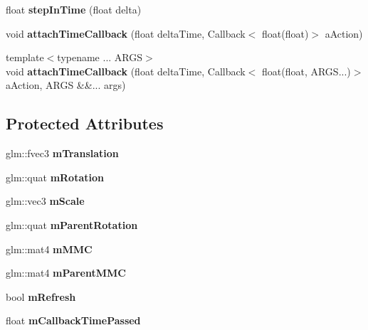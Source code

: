 \begin{DoxyCompactItemize}
float {\bfseries step\+In\+Time} (float delta)
\item 
\mbox{\label{classflw_1_1flf_1_1Moveable_a1f94fcdf158004066e124a9a189def51}} 
void {\bfseries attach\+Time\+Callback} (float delta\+Time, Callback$<$ float(float)$>$ a\+Action)
\item 
\mbox{\label{classflw_1_1flf_1_1Moveable_a3e0bad485cd760d414809477daeadefe}} 
{\footnotesize template$<$typename ... A\+R\+GS$>$ }\\void {\bfseries attach\+Time\+Callback} (float delta\+Time, Callback$<$ float(float, A\+R\+G\+S...)$>$ a\+Action, A\+R\+GS \&\&... args)
\end{DoxyCompactItemize}
\subsection*{Protected Attributes}
\begin{DoxyCompactItemize}
\item 
\mbox{\label{classflw_1_1flf_1_1Moveable_abd1fd2b2b524cdb423e67ba77ca16289}} 
glm\+::fvec3 {\bfseries m\+Translation}
\item 
\mbox{\label{classflw_1_1flf_1_1Moveable_aa1c54ef32d7a521204176b96fbc8a15a}} 
glm\+::quat {\bfseries m\+Rotation}
\item 
\mbox{\label{classflw_1_1flf_1_1Moveable_ae02a226aef8ed36d884ed411e6178bee}} 
glm\+::vec3 {\bfseries m\+Scale}
\item 
\mbox{\label{classflw_1_1flf_1_1Moveable_ae390565c91451ffcc468e7819bc6d9fe}} 
glm\+::quat {\bfseries m\+Parent\+Rotation}
\item 
\mbox{\label{classflw_1_1flf_1_1Moveable_ad3c392a33196d2e71163e96e2e9522be}} 
glm\+::mat4 {\bfseries m\+M\+MC}
\item 
\mbox{\label{classflw_1_1flf_1_1Moveable_a4754ffda38a45ac1994356c59bafcf0b}} 
glm\+::mat4 {\bfseries m\+Parent\+M\+MC}
\item 
\mbox{\label{classflw_1_1flf_1_1Moveable_a830442845af89d8fa230124a87059da9}} 
bool {\bfseries m\+Refresh}
\item 
\mbox{\label{classflw_1_1flf_1_1Moveable_a773644b50985b395bc89d3260518bd1d}} 
float {\bfseries m\+Callback\+Time\+Passed}
\end{DoxyCompactItemize}


